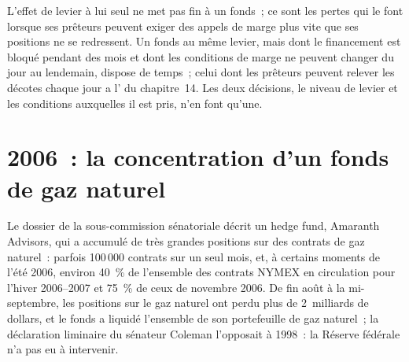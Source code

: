 \begin{remark}\label{rem:fm:case-studies-i:term}
L'effet de levier à lui seul ne met pas fin à un fonds~; ce sont les pertes qui le font lorsque ses prêteurs peuvent exiger des appels de marge plus vite que ses positions ne se redressent. Un fonds au même
levier, mais dont le financement est bloqué pendant des mois et dont les conditions de marge ne peuvent changer du jour au lendemain, dispose de temps~; celui dont les prêteurs peuvent relever les décotes chaque jour a l'
du chapitre~14. Les deux décisions, le niveau de levier et les conditions auxquelles il est pris, n'en font qu'une.
\end{remark}

\section{2006~: la concentration d'un fonds de gaz naturel}

Le dossier de la sous-commission sénatoriale décrit un hedge fund, Amaranth Advisors, qui a accumulé de très grandes positions sur des contrats de gaz naturel~: parfois 100\,000 contrats sur un seul mois, et, à certains moments de l'été 2006, environ 40~\% de l'ensemble
des contrats NYMEX en circulation pour l'hiver 2006--2007 et 75~\% de ceux de novembre 2006. De fin août à la mi-septembre, les positions
sur le gaz naturel ont perdu plus de 2~milliards de dollars, et le fonds a liquidé l'ensemble de son portefeuille de gaz naturel~; la déclaration liminaire du sénateur Coleman l'opposait à 1998~: la
Réserve fédérale n'a pas eu à intervenir.

\begin{omfigure}
\par
{}\label{fig:fm:case-studies-i:amaranth}
\end{omfigure}

